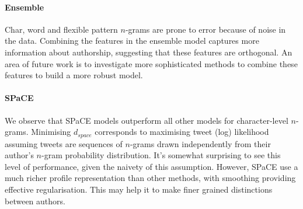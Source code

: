 \documentclass[twocolumn,10pt]{article}
\begin{document}
\paragraph{Ensemble} Char, word and flexible pattern $n$-grams are prone to error because of noise in the data. Combining the features in the ensemble model captures more information about authorship, suggesting that these features are orthogonal. An area of future work is to investigate more sophisticated methods to combine these features to build a more robust model. 



\paragraph{SPaCE} We observe that SPaCE models outperform all other models for
character-level $n$-grams.
Minimising $d_{space}$ corresponds to maximising
tweet (log) likelihood assuming tweets are sequences of
$n$-grams drawn independently from their author's $n$-gram
probability distribution.
It's somewhat surprising to see this level of performance,
given the naivety of this assumption.
However, SPaCE use a much richer profile representation
than other methods, with smoothing providing effective
regularisation. This may help it to make finer grained
distinctions between authors.
\end{document}
